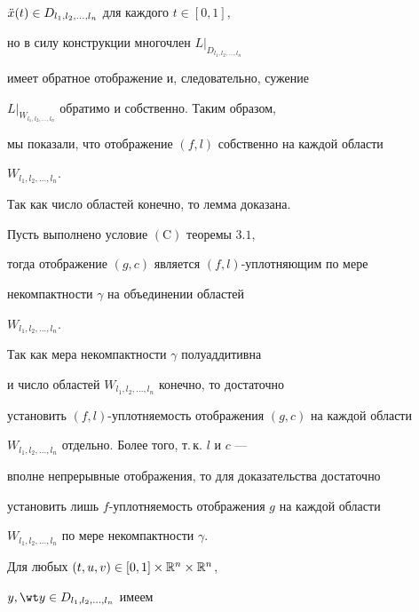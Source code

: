 \begin{pf}
\begin{pf}
$\Ddot x(t)\in D_{l_1, l_2, \dotsc, l_n}$ для каждого $t\in [0,1]$,


но в силу конструкции многочлен $L|_{D_{l_1, l_2, \dotsc, l_n}}$


имеет обратное отображение и, следовательно, сужение


$L|_{W_{l_1, l_2, \dotsc, l_n}}$ обратимо и собственно. Таким образом,


мы показали, что отображение $(f, l)$ собственно на каждой области 


$W_{l_1, l_2, \dotsc, l_n}$. 


Так как число областей конечно, то лемма доказана.


\end{pf}





\begin{lems}


Пусть выполнено условие $\mathrm{(C)}$ теоремы $3.1$, 


тогда отображение $(g, c)$ является $(f, l)$-уплотняющим по мере


некомпактности $\gamma$ на объединении областей 


$W_{l_1, l_2, \dotsc, l_n}$. 


\end{lems}





\begin{pf}


Так как мера некомпактности $\gamma$ полуаддитивна


и число областей $W_{l_1, l_2, \dotsc, l_n}$ конечно, то достаточно


установить $(f, l)$-уплотняемость отображения $(g, c)$ на каждой области


$W_{l_1, l_2, \dotsc, l_n}$ отдельно. Более того, т.\,к. $l$ и $c$ ---


вполне непрерывные отображения, то для доказательства достаточно


установить лишь $f$-уплотняемость отображения $g$ на каждой области


$W_{l_1, l_2, \dotsc, l_n}$ по мере некомпактности $\gamma$.





Для любых $(t,u,v)\in 


[0,1]\times {\Bbb R}^n \times {\Bbb R}^n$,


$y,\wt y \in D_{l_1, l_2, \dotsc, l_n}$ имеем 



\end{pf}
\end{pf}
